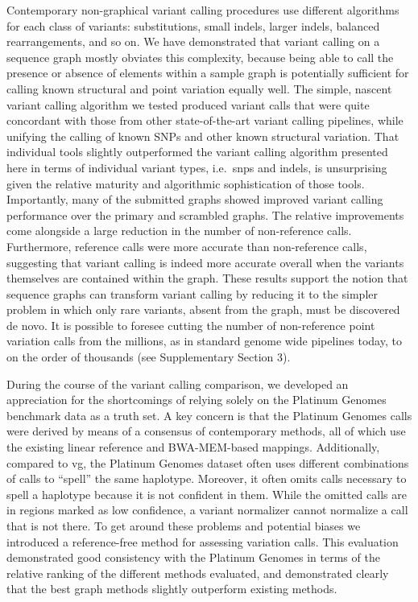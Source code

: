 Contemporary non-graphical variant calling procedures use different
algorithms for each class of variants: substitutions, small indels,
larger indels, balanced rearrangements, and so on. We have demonstrated
that variant calling on a sequence graph mostly obviates this
complexity, because being able to call the presence or absence of
elements within a sample graph is potentially sufficient for calling
known structural and point variation equally well. The simple, nascent
variant calling algorithm we tested produced variant calls that were
quite concordant with those from other state-of-the-art variant calling
pipelines, while unifying the calling of known SNPs and other known
structural variation. That individual tools slightly outperformed the
variant calling algorithm presented here in terms of individual variant
types, i.e.~snps and indels, is unsurprising given the relative maturity
and algorithmic sophistication of those tools. Importantly, many of the
submitted graphs showed improved variant calling performance over the
primary and scrambled graphs. The relative improvements come alongside a
large reduction in the number of non-reference calls. Furthermore,
reference calls were more accurate than non-reference calls, suggesting
that variant calling is indeed more accurate overall when the variants
themselves are contained within the graph. These results support the
notion that sequence graphs can transform variant calling by reducing it
to the simpler problem in which only rare variants, absent from the
graph, must be discovered de novo. It is possible to foresee cutting the
number of non-reference point variation calls from the millions, as in
standard genome wide pipelines today, to on the order of thousands (see
Supplementary Section 3).

During the course of the variant calling comparison, we developed an
appreciation for the shortcomings of relying solely on the Platinum
Genomes benchmark data as a truth set\cite{Eberle2016-zc}. A key concern
is that the Platinum Genomes calls were derived by means of a consensus
of contemporary methods, all of which use the existing linear reference
and BWA-MEM-based mappings. Additionally, compared to vg, the Platinum
Genomes dataset often uses different combinations of calls to ``spell''
the same haplotype. Moreover, it often omits calls necessary to spell a
haplotype because it is not confident in them. While the omitted calls
are in regions marked as low confidence, a variant normalizer cannot
normalize a call that is not there. To get around these problems and
potential biases we introduced a reference-free method for assessing
variation calls. This evaluation demonstrated good consistency with the
Platinum Genomes in terms of the relative ranking of the different
methods evaluated, and demonstrated clearly that the best graph methods
slightly outperform existing methods.

